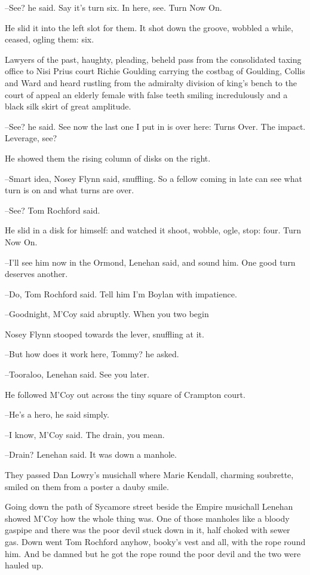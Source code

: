 --See? he said. Say it's turn six. In here, see. Turn Now On.

He slid it into the left slot for them. It shot down the groove, wobbled
a while, ceased, ogling them: six.

Lawyers of the past, haughty, pleading, beheld pass from the
consolidated taxing office to Nisi Prius court Richie Goulding carrying
the costbag of Goulding, Collis and Ward and heard rustling from the
admiralty division of king's bench to the court of appeal an elderly
female with false teeth smiling incredulously and a black silk skirt of
great amplitude.

--See? he said. See now the last one I put in is over here: Turns Over.
The impact. Leverage, see?

He showed them the rising column of disks on the right.

--Smart idea, Nosey Flynn said, snuffling. So a fellow coming in late can
see what turn is on and what turns are over.

--See? Tom Rochford said.

He slid in a disk for himself: and watched it shoot, wobble, ogle, stop:
four. Turn Now On.

--I'll see him now in the Ormond, Lenehan said, and sound him. One good
turn deserves another.

--Do, Tom Rochford said. Tell him I'm Boylan with impatience.

--Goodnight, M'Coy said abruptly. When you two begin

Nosey Flynn stooped towards the lever, snuffling at it.

--But how does it work here, Tommy? he asked.

--Tooraloo, Lenehan said. See you later.

He followed M'Coy out across the tiny square of Crampton court.

--He's a hero, he said simply.

--I know, M'Coy said. The drain, you mean.

--Drain? Lenehan said. It was down a manhole.

They passed Dan Lowry's musichall where Marie Kendall, charming
soubrette, smiled on them from a poster a dauby smile.

Going down the path of Sycamore street beside the Empire musichall
Lenehan showed M'Coy how the whole thing was. One of those manholes
like a bloody gaspipe and there was the poor devil stuck down in it, half
choked with sewer gas. Down went Tom Rochford anyhow, booky's vest
and all, with the rope round him. And be damned but he got the rope round
the poor devil and the two were hauled up.

